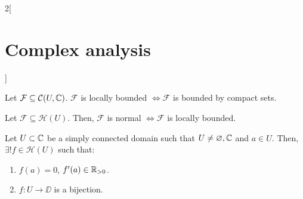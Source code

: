 \documentclass[../../../main.tex]{subfiles}
\begin{document}
\begin{multicols}{2}[\section{Complex analysis}]
  \begin{lemma}
    Let $\mathcal{F}\subseteq \mathcal{C}(U,\mathbb{C})$. $\mathcal{F}$ is locally bounded $\iff \mathcal{F}$ is bounded by compact sets.
  \end{lemma}
  \begin{theorem}
    Let $\mathcal{F}\subseteq \mathcal{H}(U)$. Then, $\mathcal{F}$ is normal $\iff \mathcal{F}$ is locally bounded.
  \end{theorem}
  \begin{theorem}
    Let $U\subset \mathbb{C}$ be a simply connected domain such that $U\ne\varnothing,\mathbb{C}$ and $a\in U$. Then, $\exists!f\in\mathcal{H}(U)$ such that:
    \begin{enumerate}
      \item $f(a)=0$, $f'(a)\in\mathbb{R}_{>0}$.
      \item $f:U\rightarrow \DD$ is a bijection.
    \end{enumerate}
  \end{theorem}
\end{multicols}
\end{document}
